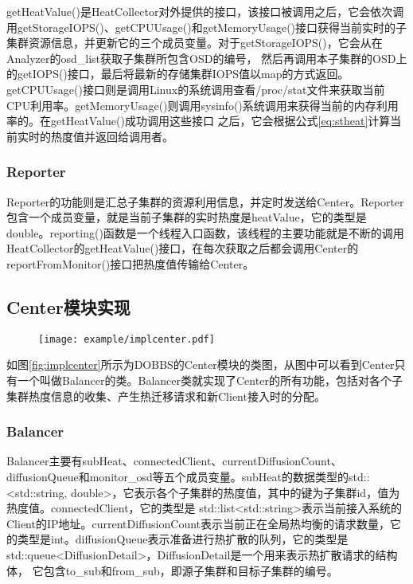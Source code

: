 getHeatValue()是HeatCollector对外提供的接口，该接口被调用之后，它会依次调用getStorageIOPS()、getCPUUsage()和getMemoryUsage()接口获得当前实时的子集群资源信息，并更新它的三个成员变量。对于getStorageIOPS()，它会从在Analyzer的osd\_list获取子集群所包含OSD的编号，
然后再调用本子集群的OSD上的getIOPS()接口，最后将最新的存储集群IOPS值以map的方式返回。getCPUUsage()接口则是调用Linux的系统调用查看/proc/stat文件来获取当前CPU利用率。getMemoryUsage()则调用sysinfo()系统调用来获得当前的内存利用率的。在getHeatValue()成功调用这些接口
之后，它会根据公式\ref{eq:stheat}计算当前实时的热度值并返回给调用者。

\subsubsection{Reporter}
Reporter的功能则是汇总子集群的资源利用信息，并定时发送给Center。Reporter包含一个成员变量，就是当前子集群的实时热度是heatValue，它的类型是double。reporting()函数是一个线程入口函数，该线程的主要功能就是不断的调用HeatCollector的getHeatValue()接口，在每次获取之后都会调用Center的reportFromMonitor()接口把热度值传输给Center。

\subsection{Center模块实现}

\begin{figure}[!htp]
    \centering
    \texttt{[image: example/implcenter.pdf]}
\end{figure}

如图\ref{fig:implcenter}所示为DOBBS的Center模块的类图，从图中可以看到Center只有一个叫做Balancer的类。Balancer类就实现了Center的所有功能，包括对各个子集群热度信息的收集、产生热迁移请求和新Client接入时的分配。

\subsubsection{Balancer}
Balancer主要有subHeat、connectedClient、currentDiffusionCount、diffusionQueue和monitor\_osd等五个成员变量。subHeat的数据类型的std::<std::string, double>，它表示各个子集群的热度值，其中的键为子集群id，值为热度值。connectedClient，它的类型是
std::list<std::string>表示当前接入系统的Client的IP地址。currentDiffusionCount表示当前正在全局热均衡的请求数量，它的类型是int。diffusionQueue表示准备进行热扩散的队列，它的类型是std::queue<DiffusionDetail>，DiffusionDetail是一个用来表示热扩散请求的结构体，
它包含to\_sub和from\_sub，即源子集群和目标子集群的编号。

